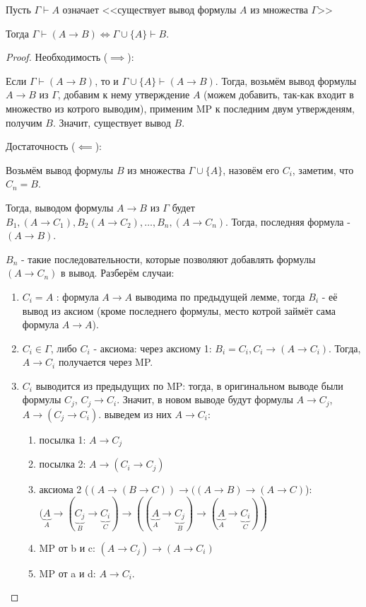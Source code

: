 \begin{lemma}[О дедукции (DT)] \thmslashn

    Пусть $\Gamma \vdash A$ означает <<существует вывод формулы $A$ из множества $\Gamma$>>

    Тогда $\Gamma \vdash (A \to B) \iff \Gamma \cup \{A\} \vdash B $.
    \begin{proof} \thmslashn
    
        Необходимость ($\implies$):

        Если $\Gamma \vdash (A \to B)$, то и $\Gamma \cup \{A\} \vdash (A \to B) $. Тогда, возьмём вывод формулы $A \to B$ из $\Gamma$, добавим к нему утверждение $A$ (можем добавить, так-как входит в множество из котрого выводим), применим MP к последним двум утвержденям, получим $B$. Значит, существует вывод $B$.

        Достаточность ($\impliedby$):

        Возьмём вывод формулы $B$ из множества $\Gamma \cup \{A\}$, назовём его $C_{i}$, заметим, что $C_{n} = B$.

        Тогда, выводом формулы $A \to B$ из $\Gamma$ будет $B_1, (A \to C_1), B_2 (A \to  C_2), \ldots, B_{n}, (A \to C_{n})$. Тогда, последняя формула - $(A \to B)$.

        $B_{n}$ - такие последовательности, которые позволяют добавлять формулы $(A \to C_{n})$ в вывод. Разберём случаи:

        \begin{enumerate}
            \item $C_{i} = A$ : формула $A \to A$ выводима по предыдущей лемме, тогда $B_{i}$ - её вывод из аксиом (кроме последнего формулы, место котрой займёт сама формула $A \to A$).
            \item $C_{i}\in \Gamma$, либо $C_{i}$ - аксиома: через аксиому 1: $B_{i} = C_{i}, C_{i} \to (A \to C_{i})$. Тогда, $A \to C_{i}$ получается через MP.
            \item $C_{i}$ выводится из предыдущих по MP: тогда, в оригинальном выводе были формулы $C_{j}$, $C_{j} \to C_{i}$. Значит, в новом выводе будут формулы $A \to C_{j}$, $A \to (C_{j} \to C_{i})$. выведем из них $A \to C_{i}$:
                \begin{enumerate}
                    \item посылка 1: $A \to C_{j}$
                    \item посылка 2: $A \to (C_{i} \to C_{j})$
                    \item аксиома 2 ($(A \to (B \to C)) \to ((A \to B) \to (A \to C)$):\\
                        $(\underbrace{A}_{A} \to (\underbrace{C_{j}}_{B} \to \underbrace{C_{i}}_{C}) \to ((\underbrace{A}_{A} \to \underbrace{C_{j}}_{B}) \to (\underbrace{A}_{A} \to \underbrace{C_{i}}_{C}))$
                    \item MP от b и c: $(A \to C_{j}) \to (A \to C_{i})$
                    \item MP от a и d: $A \to C_{i}$.
                \end{enumerate}


\end{enumerate}
\end{proof}
\end{lemma}
